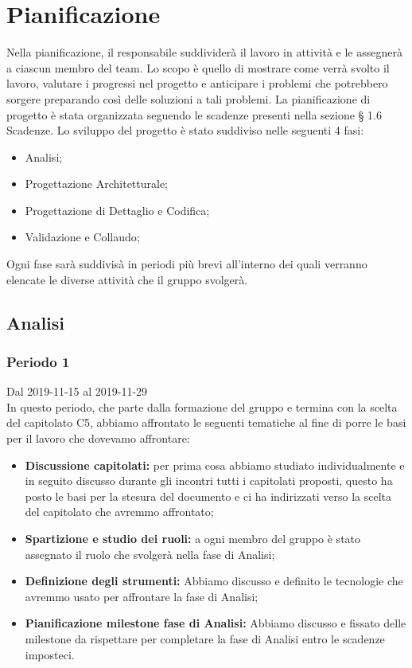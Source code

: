 \section{Pianificazione}
Nella pianificazione, il responsabile suddividerà il lavoro in attività e le assegnerà a ciascun membro del team.
Lo scopo è quello di mostrare come verrà svolto il lavoro, valutare i progressi nel progetto e anticipare i problemi che potrebbero sorgere preparando così delle soluzioni a tali problemi. 
La pianificazione di progetto è stata organizzata seguendo le scadenze presenti nella sezione § 1.6 Scadenze.
Lo sviluppo del progetto è stato suddiviso nelle seguenti 4 fasi: 
\begin{itemize}
	\item Analisi;
	\item Progettazione Architetturale;
	\item Progettazione di Dettaglio e Codifica;
	\item Validazione e Collaudo;
\end{itemize}
Ogni fase sarà suddivisà in periodi più brevi all'interno dei quali verranno elencate le diverse attività che il gruppo \Gruppo{} svolgerà.


\subsection{Analisi}

\subsubsection{Periodo 1} 
Dal 2019-11-15 al 2019-11-29\\
In questo periodo, che parte dalla formazione del gruppo e termina con la scelta del capitolato C5, abbiamo affrontato le seguenti tematiche al fine di porre le basi per il lavoro che dovevamo affrontare:\\
\begin{itemize}
	\item \textbf{Discussione capitolati:} per prima cosa abbiamo studiato individualmente e in seguito discusso durante gli incontri tutti i capitolati proposti, questo ha posto le basi per la stesura del documento \SdF{} e ci ha indirizzati verso la scelta del capitolato che avremmo affrontato;
	\item \textbf{Spartizione e studio dei ruoli:} a ogni membro del gruppo è stato assegnato il ruolo che svolgerà nella fase di Analisi;
	\item \textbf{Definizione degli strumenti:} Abbiamo discusso e definito le tecnologie che avremmo usato per affrontare la fase di Analisi;
	\item \textbf{Pianificazione milestone fase di Analisi:} Abbiamo discusso e fissato delle milestone da rispettare per completare la fase di Analisi entro le scadenze imposteci.
\end{itemize}

